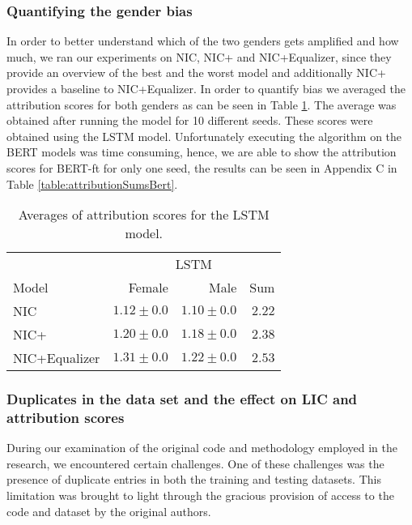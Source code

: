 \subsubsection{Quantifying the gender bias}
In order to better understand which of the two genders gets amplified and how much, we
ran our experiments on NIC, NIC+ and NIC+Equalizer, since they provide an overview of the best and 
the worst model and additionally NIC+ provides a baseline to NIC+Equalizer. In order to quantify 
bias we averaged the attribution scores for both genders as can be seen in Table \ref{table:attributionSums}. The average was obtained after running the model for 10 different 
seeds. These scores were obtained using the LSTM model. Unfortunately executing the algorithm on the 
BERT models was time consuming, hence, we are able to show the attribution scores for BERT-ft for only one seed, the results can be seen in Appendix C in Table \ref{table:attributionSumsBert}.

\begin{table}[H]
\begin{center}
\setlength{\tabcolsep}{4.25pt} %
\renewcommand{\arraystretch}{1.25} %
\begin{tabular}{lrrr}
\toprule
\multicolumn{1}{c}{} & 
\multicolumn{3}{c}{LSTM}
\\
\cmidrule(r){1-4} 
Model & Female & Male & Sum \\
\hline
NIC \cite{NIC:2015} & $1.12\pm0.0$ & $1.10\pm0.0$ & $2.22$ \\

NIC+ \cite{NICplusNICEqualizer:2018} & $1.20\pm0.0$ & $1.18\pm0.0$ & $2.38$\\

NIC+Equalizer \cite{NICplusNICEqualizer:2018} & $1.31\pm0.0$ & $1.22\pm0.0$ & $2.53$ \\

\bottomrule
\end{tabular}
\caption{Averages of attribution scores for the LSTM model. }
\label{table:attributionSums}
\end{center}
\end{table}

\subsubsection{Duplicates in the data set and the effect on LIC and attribution scores}
During our examination of the original code and methodology employed in the research, we encountered certain challenges. One of these challenges was the presence of duplicate entries in both the training and testing datasets. This limitation was brought to light through the gracious provision of access to the code and dataset by the original authors. \newline

